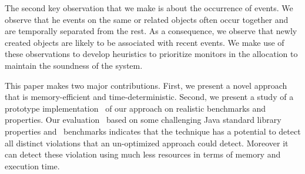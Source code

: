 The second key observation that we make is about the occurrence of events.
We observe that he events on the same or related objects often occur together
and are temporally separated from the rest. As a consequence, we observe
that newly created objects are likely to be associated with recent events.
We make use of these observations to develop heuristics to prioritize monitors
in the allocation to maintain the soundness of the system.


This paper makes two major contributions.
First, we present a novel approach~ that is memory-efficient 
and time-deterministic. Second, we present a study of a prototype 
implementation~ of our approach on realistic 
benchmarks and properties. Our evaluation~ based on some
challenging Java standard library properties and \dacapo\ benchmarks 
indicates that the technique has a potential to detect all distinct violations that an 
un-optimized approach could detect. Moreover it can detect these violation using
much less resources in terms of memory and execution time.



